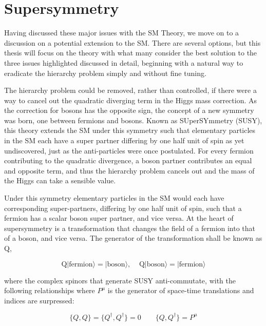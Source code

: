 \section{Supersymmetry}

Having discussed these major issues with the SM Theory, we move on to a discussion on a potential extension to the SM. There are several options, but this thesis will focus on the theory with what many consider the best solution to the three issues highlighted discussed in detail, beginning with a natural way to eradicate the hierarchy problem simply and without fine tuning.

The hierarchy problem could be removed, rather than controlled, if there were a way to cancel out the quadratic diverging term in the Higgs mass correction. As the correction for bosons has the opposite sign, the concept of a new symmetry was born, one between fermions and bosons. Known as SUperSYmmetry (SUSY), this theory extends the SM under this symmetry such that elementary particles in the SM each have a super partner differing by one half unit of spin as yet undiscovered, just as the anti-particles were once postulated. For every fermion contributing to the quadratic divergence, a boson partner contributes an equal and opposite term, and thus the hierarchy problem cancels out and the mass of the Higgs can take a sensible value.

Under this symmetry elementary particles in the SM would each have corresponding super-partners, differing by one half unit of spin, such that a fermion has a scalar boson super partner, and vice versa. At the heart of supersymmetry is a transformation that changes the field of a fermion into that of a boson, and vice versa. The generator of the transformation shall be known as Q,

\begin{equation}
\textrm{Q}|\textrm{fermion}\rangle = |\textrm{boson}\rangle,  \; \; \; \;  \textrm{Q}|\textrm{boson}\rangle = |\textrm{fermion}\rangle  
\label{eqn:Q}
\end{equation}

where the complex spinors that generate SUSY anti-commutate, with the following relationships where $P^{\mu}$ is the generator of space-time translations and indices are surpressed:


\begin{equation}
\{Q,Q\} = \{Q^{\dagger},Q^{\dagger}\} = 0 \qquad \{Q,Q^{\dagger}\} = P^{\mu} 
\end{equation} 



